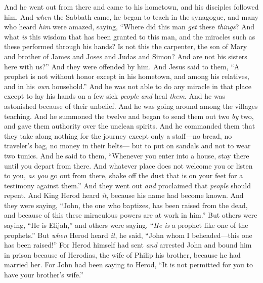\begin{biblechapter} %
 And he went out from there and came to his hometown, and his disciples followed him.
\verse And \textit{when} the Sabbath came, he began to teach in the synagogue, and many who heard \textit{him} were amazed, saying, “Where did this man \textit{get} these \textit{things}? And what \textit{is} this wisdom that has been granted to this man, and the miracles such as these performed through his hands?
\verse Is not this the carpenter, the son of Mary and brother of James and Joses and Judas and Simon? And are not his sisters here with us?” And they were offended by him.
\verse And Jesus said to them, “A prophet is not without honor except in his hometown, and among his relatives, and in his \textit{own} household.”
\verse And he was not able to do any miracle in that place except to lay his hands on a few sick \textit{people} \textit{and} heal \textit{them}.
\verse And he was astonished because of their unbelief.
 And he was going around among the villages teaching.
\verse And he summoned the twelve and began to send them out two \textit{by} two, and gave them authority over the unclean spirits.
\verse And he commanded them that they take along nothing for the journey except only a staff—no bread, no traveler’s bag, no money in their belts—
\verse but to put on sandals and not to wear two tunics.
\verse And he said to them, “Whenever you enter into a house, stay there until you depart from there.
\verse And whatever place does not welcome you or listen to you, \textit{as you} go out from there, shake off the dust that is on your feet for a testimony against them.”
\verse And they went out \textit{and} proclaimed that \textit{people} should repent.
 And King Herod heard \textit{it}, because his name had become known. And they were saying, “John, the one who baptizes, has been raised from the dead, and because of this these miraculous powers are at work in him.”
\verse But others were saying, “He is Elijah,” and others were saying, “\textit{He is} a prophet like one of the prophets.”
\verse But \textit{when} Herod heard \textit{it}, he said, “John whom I beheaded—this one has been raised!”
\verse For Herod himself had sent \textit{and} arrested John and bound him in prison because of Herodias, the wife of Philip his brother, because he had married her.
\verse For John had been saying to Herod, “It is not permitted for you to have your brother’s wife.”

\end{biblechapter}
